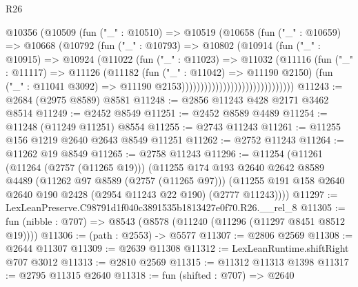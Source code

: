 \begin{lexlean}{R26}
\begin{coremodule}
                                  @10356
                                    (@10509
                                      (fun ("_" : @10510) =>
                                      @10519
                                        (@10658
                                          (fun ("_" : @10659) =>
                                          @10668
                                            (@10792
                                              (fun ("_" : @10793) =>
                                              @10802
                                                (@10914
                                                  (fun ("_" : @10915) =>
                                                  @10924
                                                    (@11022
                                                      (fun ("_" : @11023) =>
                                                      @11032
                                                        (@11116
                                                          (fun ("_" : @11117) =>
                                                          @11126
                                                            (@11182
                                                              (fun ("_" : @11042) => @11190 @2150)
                                                              (fun ("_" : @11041 @3092) =>
                                                              @11190
                                                                @2153))))))))))))))))))))))))))))))
@11243 := @2684 (@2975 @8589) @8581
@11248 := @2856 @11243 @428 @2171 @3462 @8514
@11249 := @2452 @8549
@11251 := @2452 @8589 @4489
@11254 := @11248 (@11249 @11251) @8554
@11255 := @2743 @11243
@11261 := @11255 @156 @1219 @2640 @2643 @8549 @11251
@11262 := @2752 @11243
@11264 := @11262 @19 @8549
@11265 := @2758 @11243
@11296 := @11254
    (@11261
      (@11264 (@2757 (@11265 @19)))
      (@11255
        @174
        @193
        @2640
        @2642
        @8589
        @4489
        (@11262 @97 @8589 (@2757 (@11265 @97)))
        (@11255 @191 @158 @2640 @2640 @190 @2428 (@2954 @11243 @22 @190) (@2777 @11243))))
@11297 := LexLeanPreserve.C98791d1f040c3891535b1813427e0f70.R26.__rel_8
@11305 := fun (nibble : @707) => @8543 (@8578 (@11240 (@11296 (@11297 @8451 @8512 @19))))
@11306 := (path : @2553) -> @5577
@11307 := @2806 @2569
@11308 := @2644 @11307
@11309 := @2639 @11308
@11312 := LexLeanRuntime.shiftRight @707 @3012
@11313 := @2810 @2569
@11315 := @11312 @11313 @1398
@11317 := @2795 @11315 @2640
@11318 := fun (shifted : @707) => @2640

\end{coremodule}
\end{lexlean}
